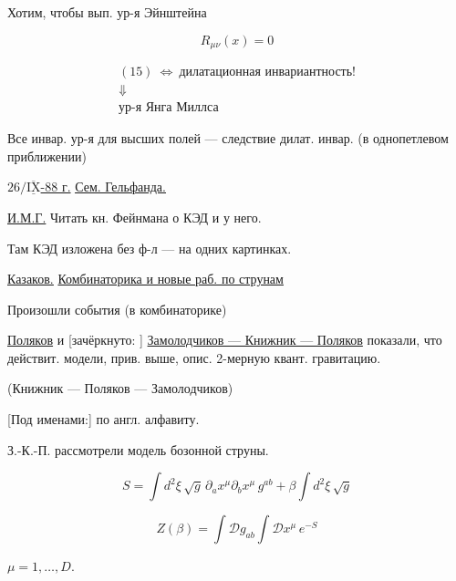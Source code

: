 Хотим, чтобы вып. ур-я Эйнштейна

\begin{equation*}
R_{\mu\nu}(x)=0
\tag{15}
\end{equation*}

\begin{equation*}
\begin{gathered}
(15)\ \Leftrightarrow\ \text{дилатационная инвариантность!}\\
\Downarrow\\
\text{ур-я Янга Миллса}
\end{gathered}
\end{equation*}

Все инвар. ур-я для высших полей — следствие дилат.
инвар. (в однопетлевом приближении)



\underline{$26/\overline{\underline{\mathrm{IX}}}$-88 г.}
\qquad \underline{\underline{Сем. Гельфанда.}}

\underline{И.М.Г.} Читать кн. Фейнмана о КЭД и
у него.

Там КЭД изложена без ф-л — на одних картинках.

\underline{\underline{Казаков.}}
\quad \underline{Комбинаторика и новые раб. по струнам}

Произошли события (в комбинаторике)

\underline{Поляков} и
[зачёркнуто: ]
\underline{Замолодчиков — Книжник — Поляков}
показали, что действит. модели, прив. выше, опис. 2-мерную
квант. гравитацию.

(Книжник — Поляков — Замолодчиков)

[Под именами:] по англ. алфавиту.

З.-К.-П. рассмотрели модель бозонной струны.

\begin{equation*}
S=\int d^{2}\xi\,\sqrt{g}\,\partial_a x^{\mu}\partial_b x^{\mu}\,g^{ab}
+\beta\int d^{2}\xi\,\sqrt{g}
\tag{1}
\end{equation*}

\begin{equation*}
Z(\beta)=\int\mathcal{D}g_{ab}\int\mathcal{D}x^{\mu}\,e^{-S}
\tag{2}
\end{equation*}

$\mu=1,\ldots,D$.


